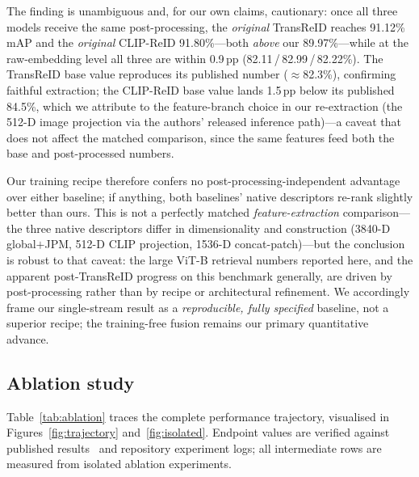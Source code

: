 \documentclass[10pt,a4paper]{article}
\begin{document}
The finding is unambiguous and, for our own claims, cautionary: once all three
models receive the same post-processing, the \emph{original} TransReID reaches
91.12\% mAP and the \emph{original} CLIP-ReID 91.80\%---both \emph{above} our
89.97\%---while at the raw-embedding level all three are within 0.9\,pp
(82.11\,/\,82.99\,/\,82.22\%). The TransReID base value reproduces its
published number ($\approx$82.3\%), confirming faithful extraction; the
CLIP-ReID base value lands 1.5\,pp below its published 84.5\%, which we
attribute to the feature-branch choice in our re-extraction (the 512-D image
projection via the authors' released inference path)---a caveat that does not
affect the matched comparison, since the same features feed both the base and
post-processed numbers.

Our training recipe therefore confers no post-processing-independent advantage
over either baseline; if anything, both baselines' native descriptors re-rank
slightly better than ours. This is not a perfectly matched
\emph{feature-extraction} comparison---the three native descriptors differ in
dimensionality and construction (3840-D global$+$JPM, 512-D CLIP projection,
1536-D concat-patch)---but the conclusion is robust to that caveat: the large
ViT-B retrieval numbers reported here, and the apparent post-TransReID progress
on this benchmark generally, are driven by post-processing rather than by
recipe or architectural refinement. We accordingly frame our single-stream
result as a \emph{reproducible, fully specified} baseline, not a superior
recipe; the training-free fusion remains our primary quantitative advance.

\subsection{Ablation study}
Table~\ref{tab:ablation} traces the complete performance trajectory,
visualised in Figures~\ref{fig:trajectory} and~\ref{fig:isolated}. Endpoint
values are verified against published results~\cite{he2021transreid} and
repository experiment logs; all intermediate rows are measured from isolated
ablation experiments.
\end{document}
